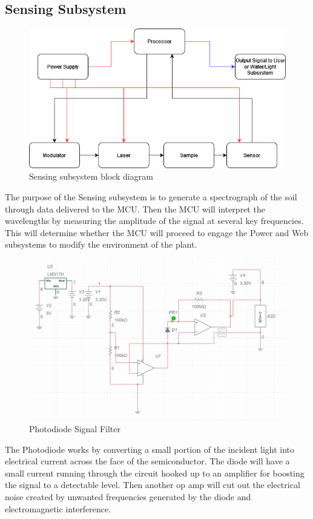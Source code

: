 \subsection{Sensing Subsystem}
\begin{figure}[H]
    \caption{Sensing subsystem block diagram}
    \centering
    \includegraphics[width=\textwidth]{images/IRSensorBlockDiagram.png}
\end{figure}


The purpose of the Sensing subsystem is to generate a spectrograph of the soil through data delivered to the MCU. Then the MCU will interpret the wavelengths by measuring the amplitude of the signal at several key frequencies. This will determine whether the MCU will proceed to engage the Power and Web subsystems to modify the environment of the plant.


\begin{figure}[H]
    \caption{Photodiode Signal Filter}
    \centering
    \includegraphics[width=\textwidth]{images/ElectricalSignalFilteringSD1.png}
\end{figure}


The Photodiode works by converting a small portion of the incident light into electrical current across the face of the semiconductor. The diode will have a small current running through the circuit hooked up to an amplifier for boosting the signal to a detectable level. Then another op amp will cut out the electrical noise created by unwanted frequencies generated by the diode and electromagnetic interference.

